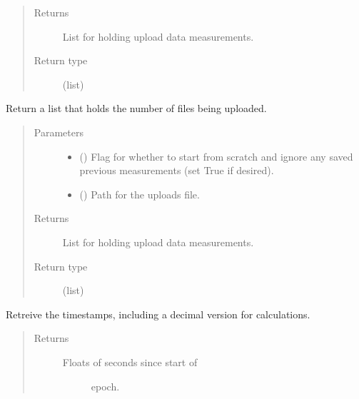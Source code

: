 \documentclass[letterpaper,10pt,english]{sphinxmanual}
\begin{document}
\begin{fulllineitems}
\begin{fulllineitems}
\begin{quote}
\begin{description}
\item[{Returns}] \leavevmode
List for holding upload data measurements.

\item[{Return type}] \leavevmode
{\hyperref[\detokenize{src:src.timer.TimeIt.time_data}]{}} (list)

\end{description}\end{quote}

\end{fulllineitems}


\begin{fulllineitems}
\label{\detokenize{src:src.timer.TimeIt.read_upload_data}}
Return a list that holds the number of files being uploaded.
\begin{quote}\begin{description}
\item[{Parameters}] \leavevmode\begin{itemize}
\item {} 
 () \textendash{} Flag for whether to start from scratch and ignore any
saved previous measurements (set True if desired).

\item {} 
 () \textendash{} Path for the uploads file.

\end{itemize}

\item[{Returns}] \leavevmode
List for holding upload data measurements.

\item[{Return type}] \leavevmode
{\hyperref[\detokenize{src:src.timer.TimeIt.upload_data}]{}} (list)

\end{description}\end{quote}

\end{fulllineitems}


\begin{fulllineitems}
\label{\detokenize{src:src.timer.TimeIt.time_data_to_dec}}
Retreive the timestamps, including a decimal version for calculations.
\begin{quote}\begin{description}
\item[{Returns}] \leavevmode
\begin{description}
\item[{Floats of seconds since start of}] \leavevmode
epoch.


\end{description}
\end{description}
\end{quote}
\end{fulllineitems}
\end{fulllineitems}
\end{document}
